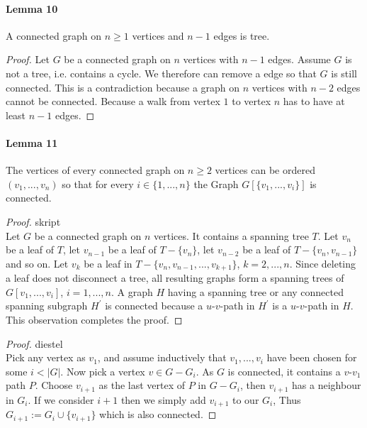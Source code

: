 \paragraph{Lemma 10} A connected graph on $ n \geq 1 $ vertices and $ n-1 $ edges is 
tree.
\begin{proof}
    Let $ G $ be a connected graph on $ n $ vertices with $ n-1 $ edges. 
    Assume $ G $ is not a  tree, i.e. contains a cycle. We therefore 
    can remove a edge so that $ G $ is still connected.
    This is a contradiction because a graph on $ n $ vertices with $ n-2 $ edges 
    cannot be connected. Because a walk from vertex $ 1 $ to vertex $ n $ has to 
    have at least $ n-1 $ edges.
\end{proof}

\paragraph{Lemma 11} The vertices of every connected graph on $ n \geq 2 $ vertices 
can be ordered $ (v_1,...,v_n) $ so that for every $ i \in \{1,...,n\} $ the 
Graph $ G[\{v_1,...,v_i\}] $ is connected.
\begin{proof}{skript} $ $ \\
    Let $ G $ be a connected graph on $ n $ vertices. It contains a spanning tree $ T $.
    Let $ v_n $ be a leaf of $ T $, let $ v_{n-1} $ be a leaf of $ T - \{v_n\} $,
    let $ v_{n-2} $ be a leaf of $ T - \{v_n,v_{n-1}\} $ and so on.
    Let $ v_k $ be a leaf in $ T - \{v_n, v_{n-1},...,v_{k+1}\} $, $ k = 2,...,n $.
    Since deleting a leaf does not disconnect a tree, all resulting graphs form
    a spanning trees of $ G[{v_1,...,v_i}] $, $ i = 1,...,n $. A graph $ H $ having 
    a spanning tree or any connected spanning subgraph $ H^\prime $ is connected
    because a $u$-$v$-path in $ H^\prime $ is a $u$-$v$-path in $ H $. This observation
    completes the proof.
\end{proof}
\begin{proof}{diestel} $ $ \\
    Pick any vertex as $ v_1 $, and assume inductively that $ v_1,...,v_i $ have been 
    chosen for some $ i < |G| $. Now pick a vertex $ v \in G - G_i $. As $ G $ is 
    connected, it contains a $v$-$v_1$ path $ P$. Choose $ v_{i+1} $ as the last vertex
    of $ P $ in $ G - G_i $, then $ v_{i+1} $ has a neighbour in $ G_i $. 
    If we consider $ i+1 $ then we simply add $ v_{i+1} $ to our $ G_i $, Thus
    $ G_{i+1} := G_i \cup \{v_{i+1}\} $ which is also connected.
\end{proof}

